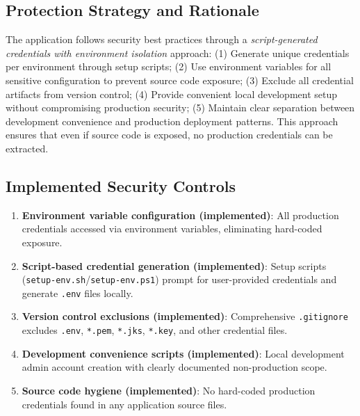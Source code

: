 \documentclass[]{UCD_CS_FYP_Report}
\begin{document}
\subsection{Protection Strategy and Rationale}
The application follows security best practices through a \textit{script-generated credentials with environment isolation} approach: (1) Generate unique credentials per environment through setup scripts; (2) Use environment variables for all sensitive configuration to prevent source code exposure; (3) Exclude all credential artifacts from version control; (4) Provide convenient local development setup without compromising production security; (5) Maintain clear separation between development convenience and production deployment patterns. This approach ensures that even if source code is exposed, no production credentials can be extracted.

\subsection{Implemented Security Controls}
\begin{enumerate}
	\item \textbf{Environment variable configuration (implemented)}: All production credentials accessed via environment variables, eliminating hard-coded exposure.
	\item \textbf{Script-based credential generation (implemented)}: Setup scripts (\texttt{setup-env.sh}/\texttt{setup-env.ps1}) prompt for user-provided credentials and generate \texttt{.env} files locally.
	\item \textbf{Version control exclusions (implemented)}: Comprehensive \texttt{.gitignore} excludes \texttt{.env}, \texttt{*.pem}, \texttt{*.jks}, \texttt{*.key}, and other credential files.
	\item \textbf{Development convenience scripts (implemented)}: Local development admin account creation with clearly documented non-production scope.
	\item \textbf{Source code hygiene (implemented)}: No hard-coded production credentials found in any application source files.
\end{enumerate}
\end{document}
